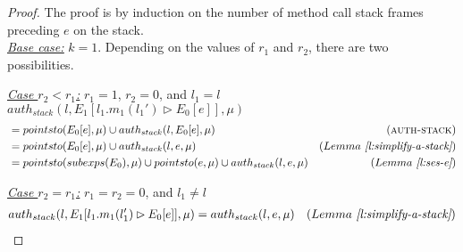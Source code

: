 \documentclass{llncs}
\begin{document}
\begin{proof} The proof is by induction on the number of method call stack frames preceding $e$ on the stack.\\

\noindent\underline{\underline{\textit{Base case:}}} $k = 1$. Depending on the values of $r_1$ and $r_2$, there are two possibilities.

\noindent\underline{\textit{Case $r_2 < r_1$:}} $r_1 = 1$, $r_2 = 0$, and $l_1 = l$\\
\noindent$auth_{stack}(l, E_1[l_1.m_1(l_1') \rhd E_0[e]], \mu)$
\vspace{-7pt}
\begin{align*}
&= pointsto(E_0[e], \mu) \cup auth_{stack}(l, E_0[e], \mu) & (\textsc{auth-stack}) \\
&= pointsto(E_0[e], \mu) \cup auth_{stack}(l, e, \mu) & (Lemma~\textit{\ref{l:simplify-a-stack}}) \\
&= pointsto(subexps(E_0), \mu) \cup pointsto(e, \mu) \cup auth_{stack}(l, e, \mu) & (Lemma~\textit{\ref{l:ses-e}})
\end{align*}

\noindent\underline{\textit{Case $r_2 = r_1$:}} $r_1 = r_2 = 0$, and $l_1 \neq l$
\vspace{-7pt}
\begin{align*}
auth_{stack}(l, E_1[l_1.m_1(l_1') \rhd E_0[e]], \mu) &= auth_{stack}(l, e, \mu) & (Lemma~\textit{\ref{l:simplify-a-stack}})
\end{align*}


\end{proof}
\end{document}
